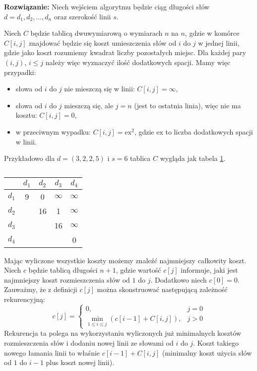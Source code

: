 \textbf{Rozwiązanie:} Niech wejściem algorytmu będzie ciąg  długości słów $d=d_1,d_2,\dotsc,d_n$ oraz szerokość linii $s$.

Niech $C$ będzie tablicą dwuwymiarową o wymiarach $n$ na $n$, gdzie w komórce $C[i,j]$ znajdować będzie się koszt umieszczenia słów od $i$ do $j$ w jednej linii, gdzie jako koszt rozumiemy kwadrat liczby pozostałych miejsc. Dla każdej pary $(i,j)$, $i\leq j$ należy więc wyznaczyć ilość dodatkowych spacji. Mamy więc przypadki: \begin{itemize}
	\item słowa od $i$ do $j$ nie mieszczą się w linii: $C[i,j]=\infty$,
	\item słowa od $i$ do $j$ mieszczą się, ale $j=n$ (jest to ostatnia linia), więc nie ma kosztu: $C[i,j]=0$,
	\item w przeciwnym wypadku: $C[i,j]=\textrm{ex}^2$, gdzie $\textrm{ex}$ to liczba dodatkowych spacji w linii.
\end{itemize}

Przykładowo dla $d=(3,2,2,5)$ i $s=6$ tablica $C$ wygląda jak tabela \ref{tab_zad13_C}.
\begin{table}[H]
	\centering
	\def\arraystretch{1.25}
	\begin{tabular}{|c|cccc|}
		\hline \diagbox{$i$}{$j$}
		& \multicolumn{1}{c|}{$d_1$} & \multicolumn{1}{c|}{$d_2$} & \multicolumn{1}{c|}{$d_3$} & \multicolumn{1}{c|}{$d_4$} \\ \hline
		$d_1$ & 9 & 0  & $\infty$ & $\infty$ \\ \cline{1-1}
		$d_2$ &   & 16 &        1 & $\infty$ \\ \cline{1-1}
		$d_3$ &   &    &       16 & $\infty$ \\ \cline{1-1}
		$d_4$ &   &    &          &        0 \\ \cline{1-1}
		\hline
	\end{tabular}
	\caption{}
	\label{tab_zad13_C}
\end{table}

Mając wyliczone wszystkie koszty możemy znaleźć najmniejszy całkowity koszt. Niech $c$ będzie tablicą długości $n+1$, gdzie wartość $c[j]$ informuje, jaki jest najmniejszy koszt rozmieszczenia słów od $1$ do $j$. Dodatkowo niech $c[0]=0$. Zauważmy, że z definicji $c[j]$ można skonstruować następującą zależność rekurencyjną: \[
	c[j]=\begin{cases}
		0, &j=0\\
		\min\limits_{1 \leq i \leq j}\left(c[i-1]+C[i,j]\right), &j>0
	\end{cases}
\]
Rekurencja ta polega na wykorzystaniu wyliczonych już minimalnych kosztów rozmieszczenia słów i dodaniu nowej linii ze słowami od $i$ do $j$. Koszt takiego nowego łamania linii to właśnie $c[i-1] + C[i,j]$ (minimalny koszt użycia słów od $1$ do $i-1$ plus koszt nowej linii).

